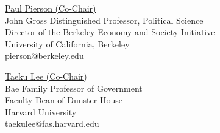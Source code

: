 \documentclass[10pt, letterpaper]{article}
\begin{document}
\parbox[t]{0.475\textwidth}{\raggedright %
{\href{https://polisci.berkeley.edu/people/person/paul-pierson}{Paul Pierson (Co-Chair)}}\\
John Gross Distinguished Professor, Political Science\\
Director of the Berkeley Economy and Society Initiative\\
University of California, Berkeley \\ %
\href{mailto:pierson@berkeley.edu}{pierson@berkeley.edu} %
}
\hspace{0.04\textwidth}
\parbox[t]{0.475\textwidth}{\raggedright %
\href{https://gov.harvard.edu/people/taeku-lee}{Taeku Lee (Co-Chair)}\\
Bae Family Professor of Government\\ 
Faculty Dean of Dunster House\\
Harvard University\\ %
\href{mailto:taekulee@fas.harvard.edu}{taekulee@fas.harvard.edu}
}
\par\vspace{0.9\baselineskip}
\end{document}
